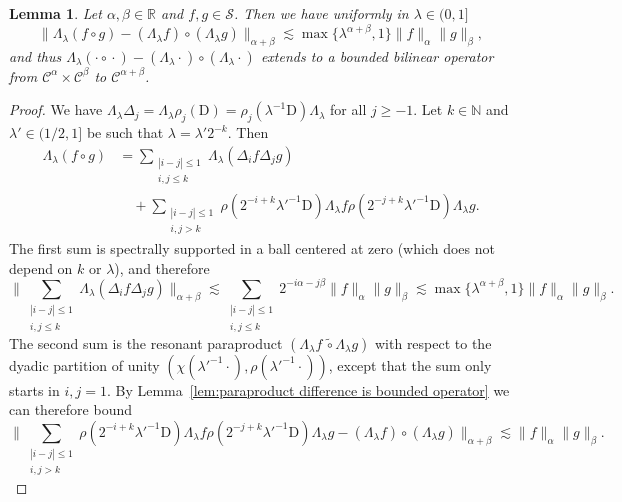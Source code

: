 \documentclass[a4paper,11pt]{article}
\newcommand{\mathD}{\mathrm{D}}
\newtheorem{lemma}[theorem]{Lemma}
\theoremstyle{remark}
\newcommand{\R}{\mathbb{R}}
\newcommand{\N}{\mathbb{N}}
\newcommand{\CC}{\ensuremath{\mathscr{C}}}
\newcommand{\CS}{\ensuremath{\mathscr{S}}}
\newcommand{\reso}{\,\mathord{\circ}\,}
\begin{document}
\begin{lemma}\label{lem:scaling commutator}
   Let $\alpha, \beta \in \R$ and $f, g \in \CS$. Then we have uniformly in $\lambda \in (0,1]$
   \[
      \| \Lambda_\lambda(f\reso g) - (\Lambda_\lambda f) \reso (\Lambda_\lambda g) \|_{\alpha+\beta} \lesssim \max\{\lambda^{\alpha+\beta}, 1\} \| f \|_\alpha \|g\|_\beta,
   \]
   and thus $ \Lambda_\lambda(\cdot\reso \cdot) - (\Lambda_\lambda \cdot) \reso (\Lambda_\lambda \cdot)$ extends to a bounded bilinear operator from $\CC^\alpha \times \CC^\beta$ to $\CC^{\alpha+\beta}$.
\end{lemma}
\begin{proof}
   We have $\Lambda_\lambda \Delta_j = \Lambda_\lambda \rho_j(\mathD) = \rho_j(\lambda^{-1} \mathD) \Lambda_\lambda$ for all $j \geqslant -1$. Let $k \in \N$ and $\lambda' \in (1/2,1]$ be such that $\lambda = \lambda' 2^{-k}$. Then
   \begin{align}\label{eq:scaling commutator pr1} \nonumber
      \Lambda_\lambda (f \reso g) & = \sum_{\substack{|i-j| \leqslant 1 \\ i,j \leqslant k}} \Lambda_\lambda ( \Delta_i f \Delta_j g) \\
      &\quad + \sum_{\substack{|i-j| \leqslant 1 \\ i,j > k}} \rho(2^{-i+k} \lambda'^{-1} \mathD) \Lambda_\lambda f \rho(2^{-j+k} \lambda'^{-1} \mathD) \Lambda_\lambda g.
   \end{align}
   The first sum is spectrally supported in a ball centered at zero (which does not depend on $k$ or $\lambda$), and therefore
   \[
      \bigg\|  \sum_{\substack{|i-j| \leqslant 1 \\ i,j \leqslant k}} \Lambda_\lambda ( \Delta_i f \Delta_j g) \bigg\|_{\alpha + \beta} \lesssim \sum_{\substack{|i-j| \leqslant 1 \\ i,j \leqslant k}} 2^{-i \alpha -j\beta} \|f\|_\alpha \|g\|_\beta \lesssim \max\{\lambda^{\alpha+\beta},1\} \|f\|_\alpha \|g\|_\beta.
   \]
   The second sum is the resonant paraproduct $(\Lambda_\lambda f \, \widetilde{\reso} \Lambda_\lambda g)$ with respect to the dyadic partition of unity $(\chi(\lambda'^{-1} \cdot), \rho(\lambda'^{-1}\cdot))$, except that the sum only starts in $i,j =1$. By Lemma~\ref{lem:paraproduct difference is bounded operator} we can therefore bound
   \[
      \bigg\| \sum_{\substack{|i-j| \leqslant 1 \\ i,j > k}} \rho(2^{-i+k} \lambda'^{-1} \mathD) \Lambda_\lambda f \rho(2^{-j+k} \lambda'^{-1} \mathD) \Lambda_\lambda g - (\Lambda_\lambda f) \reso (\Lambda_\lambda g) \bigg\|_{\alpha+\beta} \lesssim \|f \|_\alpha \|g\|_\beta.
   \]
\end{proof}
\end{document}
